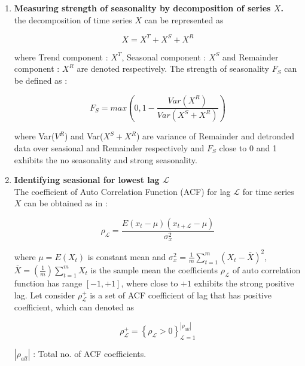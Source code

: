 \documentclass[a4paper, fleqn]{cas-sc}
\theoremstyle{definition}
\theoremstyle{remark}
\begin{document}
\begin{enumerate}[label=(\alph*)]

\item \textbf{Measuring strength of seasonality by decomposition of series $X$.}\\
the decomposition of time series $X$ can be represented  as 

\begin{equation}
  \label{x}
  X = X^T + X^S +X^R
\end{equation}

where Trend component : $X^T$,  Seasonal component :  $X^S$ and Remainder component :  $X^R$ are denoted respectively. 
The strength of seasonality $F_S$ can be defined as : 

\begin{equation}\label{fs}
  F_S=max \left(0, 1- \frac{Var (X^R)}{Var(X^S + X^R)} \right)
\end{equation}

where Var($V^R$) and Var($X^S + X^R$) are variance of Remainder and detronded data over seasional and Remainder respectively and $F_S$ close to 0 and 1 exhibits the no seasonality and strong seasonality.

\item \textbf{Identifying seasional for lowest lag $\mathscr{L}$} \\
The coefficient of Auto Correlation Function (ACF) for lag $\mathscr{L}$ for time series $X$ can be obtained as in : 

\begin{equation}
  \label{rovh}
  \rho_{\mathscr{L}}=\frac{E(x_t - \mu)(x_{t+ \mathscr{L}}-\mu)}{\sigma_x^2}
\end{equation}

where $\mu=E(X_t)$ is constant mean and $\sigma_x^2 = \frac{1}{m} \sum_{t=1}^{m} (X_t - \bar{X} )^2$,  $\bar{X}= \left(\frac{1}{m} \right) \sum_{t=1}^{m} X_t$ is the sample mean the coefficients $\rho_\mathscr{L}$ of auto correlation function has range $[-1,  +1]$,  where close to $+1$ exhibits the strong positive lag. Let consider $\rho_\mathscr{L}^+$ is a set of ACF coefficient of lag that has positive coefficient,  which can denoted as

\begin{equation}\label{rhl}
  \rho_\mathscr{L}^+ ={\left\{ \rho_\mathscr{L} > 0 \right\}}_{\mathscr{L}=1}^{\left| \rho_{all}  \right|}
\end{equation} 

$\left|\rho_{all}  \right|$ :  Total no. of ACF coefficients.\\



\end{enumerate}
\end{document}
